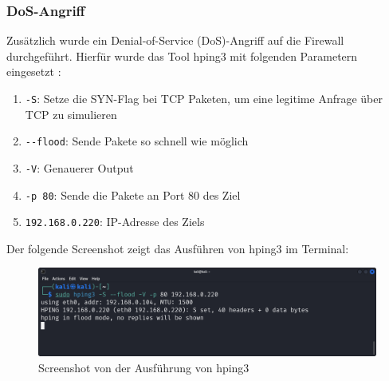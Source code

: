 \documentclass[
    a4paper,
    pagesize,
	pdftex,
    12pt,
]{scrartcl}
\begin{document}
\subsubsection{DoS-Angriff}
Zusätzlich wurde ein Denial-of-Service (DoS)-Angriff auf die Firewall durchgeführt. Hierfür wurde das Tool hping3 mit folgenden Parametern eingesetzt \cite{hping-kalitools}:
\begin{enumerate}
	\item \lstinline[breaklines]|-S|: Setze die SYN-Flag bei TCP Paketen, um eine legitime Anfrage über TCP zu simulieren
	\item \lstinline[breaklines]|--flood|: Sende Pakete so schnell wie möglich
	\item \lstinline[breaklines]|-V|: Genauerer Output
	\item \lstinline[breaklines]|-p 80|: Sende die Pakete an Port 80 des Ziel
	\item \lstinline[breaklines]|192.168.0.220|: IP-Adresse des Ziels
\end{enumerate}

Der folgende Screenshot zeigt das Ausführen von hping3 im Terminal:
\begin{figure}[H]
	\centering
	\includegraphics[width=12cm]{dos-hping3.png}
	\caption{Screenshot von der Ausführung von hping3}
	\label{fig:dos-hpgin3}
\end{figure}
\end{document}
